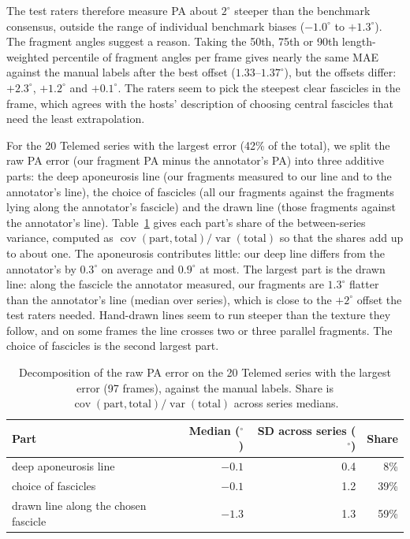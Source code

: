 \documentclass[11pt,a4paper]{article}
\begin{document}
The test raters therefore measure PA about $2^\circ$ steeper than the benchmark consensus, outside the range of individual benchmark biases ($-1.0^\circ$ to $+1.3^\circ$). The fragment angles suggest a reason. Taking the 50th, 75th or 90th length-weighted percentile of fragment angles per frame gives nearly the same MAE against the manual labels after the best offset ($1.33$--$1.37^\circ$), but the offsets differ: $+2.3^\circ$, $+1.2^\circ$ and $+0.1^\circ$. The raters seem to pick the steepest clear fascicles in the frame, which agrees with the hosts' description of choosing central fascicles that need the least extrapolation.

For the 20 Telemed series with the largest error (42\% of the total), we split the raw PA error (our fragment PA minus the annotator's PA) into three additive parts: the deep aponeurosis line (our fragments measured to our line and to the annotator's line), the choice of fascicles (all our fragments against the fragments lying along the annotator's fascicle) and the drawn line (those fragments against the annotator's line). Table~\ref{tab:decomp} gives each part's share of the between-series variance, computed as $\operatorname{cov}(\text{part},\text{total})/\operatorname{var}(\text{total})$ so that the shares add up to about one. The aponeurosis contributes little: our deep line differs from the annotator's by $0.3^\circ$ on average and $0.9^\circ$ at most. The largest part is the drawn line: along the fascicle the annotator measured, our fragments are $1.3^\circ$ flatter than the annotator's line (median over series), which is close to the $+2^\circ$ offset the test raters needed. Hand-drawn lines seem to run steeper than the texture they follow, and on some frames the line crosses two or three parallel fragments. The choice of fascicles is the second largest part.

\begin{table}[t]
\centering\small
\caption{Decomposition of the raw PA error on the 20 Telemed series with the largest error (97 frames), against the manual labels. Share is $\operatorname{cov}(\text{part},\text{total})/\operatorname{var}(\text{total})$ across series medians.}
\label{tab:decomp}
\begin{tabular}{@{}lrrr@{}}
\toprule
Part & Median ($^\circ$) & SD across series ($^\circ$) & Share \\
\midrule
deep aponeurosis line & $-0.1$ & 0.4 & 8\% \\
choice of fascicles & $-0.1$ & 1.2 & 39\% \\
drawn line along the chosen fascicle & $-1.3$ & 1.3 & 59\% \\
\bottomrule
\end{tabular}
\end{table}
\end{document}
